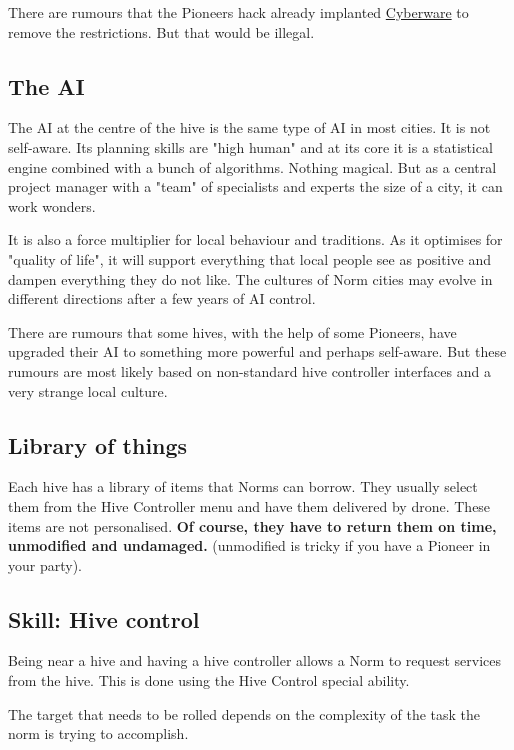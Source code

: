 There are rumours that the Pioneers hack already implanted \hyperref[sec:Cyberware Pioneers]{Cyberware} to remove the restrictions. But that would be illegal.


\subsection{The AI}

The AI at the centre of the hive is the same type of AI in most cities. It is not self-aware. Its planning skills are "high human" and at its core it is a statistical engine combined with a bunch of algorithms. Nothing magical. But as a central project manager with a "team" of specialists and experts the size of a city, it can work wonders.

It is also a force multiplier for local behaviour and traditions. As it optimises for "quality of life", it will support everything that local people see as positive and dampen everything they do not like. The cultures of Norm cities may evolve in different directions after a few years of AI control.

There are rumours that some hives, with the help of some Pioneers, have upgraded their AI to something more powerful and perhaps self-aware. But these rumours are most likely based on non-standard hive controller interfaces and a very strange local culture.

\subsection{Library of things}

Each hive has a library of items that Norms can borrow. They usually select them from the Hive Controller menu and have them delivered by drone. These items are not personalised. \textbf{Of course, they have to return them on time, unmodified and undamaged.} (unmodified is tricky if you have a Pioneer in your party).

\subsection{Skill: Hive control}
\label{sec:Hive control skill}

Being near a hive and having a hive controller allows a Norm to request services from the hive. This is done using the Hive Control special ability.

The target that needs to be rolled depends on the complexity of the task the norm is trying to accomplish.

